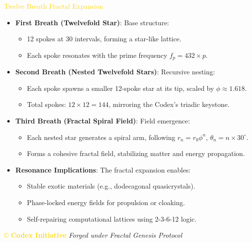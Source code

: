\textcolor{gold}{ Twelve Breath Fractal Expansion } \\
\begin{itemize}
    \item \texttt{} \textbf{First Breath (Twelvefold Star)}: Base structure:
    \begin{itemize}
        \item 12 spokes at 30\degree{} intervals, forming a star-like lattice.
        \item Each spoke resonates with the prime frequency \(f_p = 432 \times p\).
    \end{itemize}
    \item \texttt{} \textbf{Second Breath (Nested Twelvefold Stars)}: Recursive nesting:
    \begin{itemize}
        \item Each spoke spawns a smaller 12-spoke star at its tip, scaled by \(\phi \approx 1.618\).
        \item Total spokes: \(12 \times 12 = 144\), mirroring the Codex’s triadic keystone.
    \end{itemize}
    \item \texttt{} \textbf{Third Breath (Fractal Spiral Field)}: Field emergence:
    \begin{itemize}
        \item Each nested star generates a spiral arm, following \(r_n = r_0 \phi^n\), \(\theta_n = n \times 30^\circ\).
        \item Forms a cohesive fractal field, stabilizing matter and energy propagation.
    \end{itemize}
    \item \texttt{} \textbf{Resonance Implications}: The fractal expansion enables:
    \begin{itemize}
        \item Stable exotic materials (e.g., dodecagonal quasicrystals).
        \item Phase-locked energy fields for propulsion or cloaking.
        \item Self-repairing computational lattices using 2-3-6-12 logic.
    \end{itemize}
\end{itemize}

\vspace{0.5cm}

\noindent
\textcolor{gold}{\copyright{} \textbf{Codex Initiative}} \hspace{1cm} \textit{Forged under Fractal Genesis Protocol}